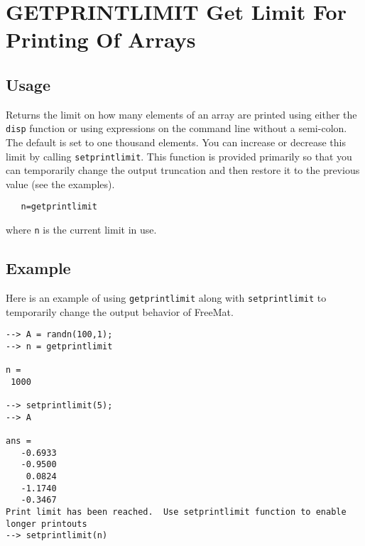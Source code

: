 \section{GETPRINTLIMIT Get Limit For Printing Of Arrays}

\subsection{Usage}

Returns the limit on how many elements of an array are printed
using either the \verb|disp| function or using expressions on the
command line without a semi-colon.  The default is set to 
one thousand elements.  You can increase or decrease this
limit by calling \verb|setprintlimit|.  This function is provided
primarily so that you can temporarily change the output truncation
and then restore it to the previous value (see the examples).
\begin{verbatim}
   n=getprintlimit
\end{verbatim}
where \verb|n| is the current limit in use.
\subsection{Example}

Here is an example of using \verb|getprintlimit| along with \verb|setprintlimit| to temporarily change the output behavior of FreeMat.
\begin{verbatim}
--> A = randn(100,1);
--> n = getprintlimit

n = 
 1000 

--> setprintlimit(5);
--> A

ans = 
   -0.6933 
   -0.9500 
    0.0824 
   -1.1740 
   -0.3467
Print limit has been reached.  Use setprintlimit function to enable longer printouts
--> setprintlimit(n)
\end{verbatim}
